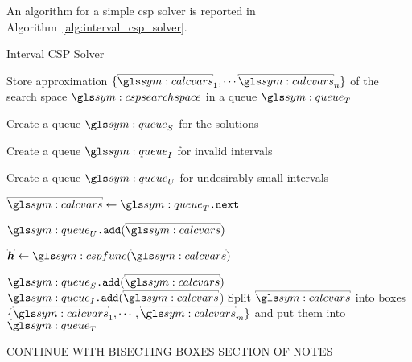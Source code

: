 				An algorithm for a simple \gls{csp} solver is reported in
				Algorithm~\ref{alg:interval_csp_solver}.

				\begin{algorithm}[ht]
					\caption{Interval CSP Solver}\label{alg:interval_csp_solver}
					\begin{algorithmic}[1]

							\State{} Store approximation
								$\{{\interval{\calcvars}}_1, \cdots
								{\interval{\calcvars}}_n\}$
								of the search space $\cspsearchspace$ in a queue
								$\queue_T$

							\State{} Create a queue $\queue_S$ for the solutions

							\State{} Create a queue $\queue_I$ for invalid
							intervals

							\State{} Create a queue $\queue_U$ for undesirably
							small intervals


								\State{} $\interval{\calcvars} \gets \queue_T\code{.next}$

								\If{$\diam(\interval{\calcvars}) < \threshold$}

									\State{} $\queue_U\code{.add}(\interval{\calcvars})$

								\Else{}
									\State{} $\interval{\vec{h}} \gets \cspfunc(\interval{\calcvars}) $

										\State{} $\queue_S\code{.add}(\interval{\calcvars})$
										\State{} $\queue_I\code{.add}(\interval{\calcvars}$)
									\Else{}
										\State{} Split $\interval{\calcvars}$ into boxes
										\(
											\{
												{\interval{\calcvars}}_1,
												\cdots,
												{\interval{\calcvars}}_m
											\}
										\) and put them into $\queue_T$
									\EndIf{}
								\EndIf{}
							\EndWhile{}
						\EndProcedure{}
					\end{algorithmic}
				\end{algorithm}

CONTINUE WITH BISECTING BOXES SECTION OF NOTES

%
%
%
